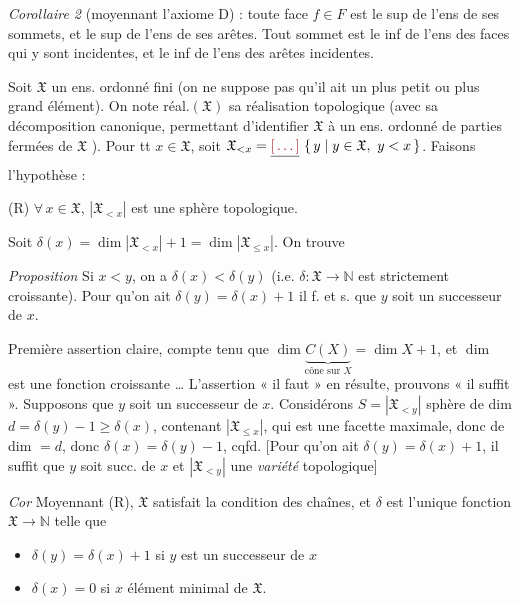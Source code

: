 \documentclass[11pt,a4paper]{article}
\begin{document}
\emph{Corollaire 2} (moyennant l'axiome D) : toute face $f \in F$ est le sup
de l'ens de ses sommets, et le sup de l'ens de ses arêtes. Tout sommet est le
inf de l'ens des faces qui y sont incidentes, et le inf de l'ens des arêtes
incidentes.


Soit $\mathfrak{X}$ un ens. ordonné fini (on ne suppose pas qu'il ait un plus
petit ou plus grand élément). On note 
réal.$(\mathfrak{X})$ sa réalisation topologique (avec sa décomposition \ill{}
canonique, permettant d'identifier $\mathfrak{X}$ à un ens. ordonné de parties
fermées de $\mathfrak{X}$ ). Pour tt
$x \in \mathfrak{X}$, soit
$\mathfrak{X}_{<x} = \struck{\ill{}}\ \{\, y \mid y \in \mathfrak{X},\ y < x \,\}$.
Faisons l'hypothèse :

(R) $\forall\, x \in \mathfrak{X}$, $|\mathfrak{X}_{<x}|$ est une sphère
topologique.

Soit $\delta(x) = \dim |\mathfrak{X}_{<x}| + 1 = \dim |\mathfrak{X}_{\leq x}|$.
On trouve

\emph{Proposition} Si $x < y$, on a $\delta(x) < \delta(y)$ (i.e.
$\delta : \mathfrak{X} \to \mathbb{N}$ est strictement croissante). Pour qu'on
ait \struck{\ill{}} $\delta(y) = \delta(x) + 1$ il f. et s. que $y$ soit un
successeur de $x$.

Première assertion claire, compte tenu que $\dim \underbrace{C(X)}_{\text{cône sur } X} = \dim X + 1$,
et $\dim$ est une fonction croissante … L'assertion « il faut » en
résulte, prouvons « il suffit ». Supposons que $y$ soit un successeur de $x$.
Considérons $S = |\mathfrak{X}_{<y}|$ sphère de dim
$d = \delta(y) - 1 \geq \delta(x)$, contenant $|\mathfrak{X}_{\leq x}|$, qui
est une facette maximale, donc de dim $= d$, donc $\delta(x) = \delta(y) - 1$,
cqfd. [Pour qu'on ait $\delta(y) = \delta(x) + 1$, il suffit que $y$ soit
succ. de $x$ et $|\mathfrak{X}_{<y}|$ une \emph{variété} topologique]


\emph{Cor} Moyennant (R), $\mathfrak{X}$ satisfait la condition des chaînes, et
$\delta$ est l'unique fonction $\mathfrak{X} \to \mathbb{N}$ telle que
\begin{itemize}
  \item[a)] $\delta(y) = \delta(x) + 1$ si $y$ est un successeur de $x$
  \item[b)] $\delta(x) = 0$ si $x$ élément minimal de $\mathfrak{X}$.
\end{itemize}
\end{document}
